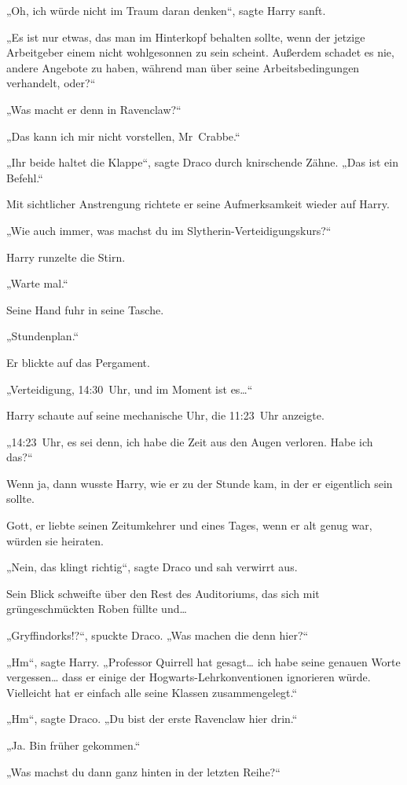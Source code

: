 {„Oh, ich würde nicht im Traum daran denken“, sagte Harry sanft.

„Es ist nur etwas, das man im Hinterkopf behalten sollte, wenn der jetzige Arbeitgeber einem nicht wohlgesonnen zu sein scheint. Außerdem schadet es nie, andere Angebote zu haben, während man über seine Arbeitsbedingungen verhandelt, oder?“

„Was macht er denn in Ravenclaw?“

„Das kann ich mir nicht vorstellen, Mr~Crabbe.“

„Ihr beide haltet die Klappe“, sagte Draco durch knirschende Zähne. „Das ist ein Befehl.“

Mit sichtlicher Anstrengung richtete er seine Aufmerksamkeit wieder auf Harry.

„Wie auch immer, was machst du im Slytherin-Verteidigungskurs?“

Harry runzelte die Stirn.

„Warte mal.“

Seine Hand fuhr in seine Tasche.

„Stundenplan.“

Er blickte auf das Pergament.

„Verteidigung, 14:30~Uhr, und im Moment ist es…“

Harry schaute auf seine mechanische Uhr, die 11:23~Uhr anzeigte.

„14:23~Uhr, es sei denn, ich habe die Zeit aus den Augen verloren. Habe ich das?“

Wenn ja, dann wusste Harry, wie er zu der Stunde kam, in der er eigentlich sein sollte.

Gott, er liebte seinen Zeitumkehrer und eines Tages, wenn er alt genug war, würden sie heiraten.

„Nein, das klingt richtig“, sagte Draco und sah verwirrt aus.

Sein Blick schweifte über den Rest des Auditoriums, das sich mit grüngeschmückten Roben füllte und…

„Gryffindorks!?“, spuckte Draco. „Was machen die denn hier?“

„Hm“, sagte Harry. „Professor Quirrell hat gesagt… ich habe seine genauen Worte vergessen… dass er einige der Hogwarts-Lehrkonventionen ignorieren würde. Vielleicht hat er einfach alle seine Klassen zusammengelegt.“

„Hm“, sagte Draco. „Du bist der erste Ravenclaw hier drin.“

„Ja. Bin früher gekommen.“

„Was machst du dann ganz hinten in der letzten Reihe?“

}
